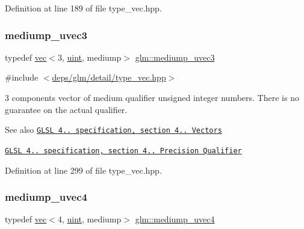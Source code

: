 Definition at line 189 of file type\+\_\+vec.\+hpp.

\mbox{\label{group__core__precision_ga0eaf34ab9ebc5e2c92cd6d6d5aa272f4}} 
\subsubsection{\texorpdfstring{mediump\+\_\+uvec3}{mediump\_uvec3}}
{\footnotesize\ttfamily typedef \hyperlink{structglm_1_1vec}{vec}$<$3, \hyperlink{group__core__precision_ga4fd29415871152bfb5abd588334147c8}{uint}, mediump$>$ \hyperlink{group__core__precision_ga0eaf34ab9ebc5e2c92cd6d6d5aa272f4}{glm\+::mediump\+\_\+uvec3}}



{\ttfamily \#include $<$\hyperlink{type__vec_8hpp}{deps/glm/detail/type\+\_\+vec.\+hpp}$>$}

3 components vector of medium qualifier unsigned integer numbers. There is no guarantee on the actual qualifier.

\begin{DoxySeeAlso}{See also}
\href{http://www.opengl.org/registry/doc/GLSLangSpec.4.20.8.pdf}{\tt G\+L\+SL 4.. specification, section 4.. Vectors} 

\href{http://www.opengl.org/registry/doc/GLSLangSpec.4.20.8.pdf}{\tt G\+L\+SL 4.. specification, section 4.. Precision Qualifier} 
\end{DoxySeeAlso}


Definition at line 299 of file type\+\_\+vec.\+hpp.

\mbox{\label{group__core__precision_ga204494f26e258e26882acf5288415ebd}} 
\subsubsection{\texorpdfstring{mediump\+\_\+uvec4}{mediump\_uvec4}}
{\footnotesize\ttfamily typedef \hyperlink{structglm_1_1vec}{vec}$<$4, \hyperlink{group__core__precision_ga4fd29415871152bfb5abd588334147c8}{uint}, mediump$>$ \hyperlink{group__core__precision_ga204494f26e258e26882acf5288415ebd}{glm\+::mediump\+\_\+uvec4}}



